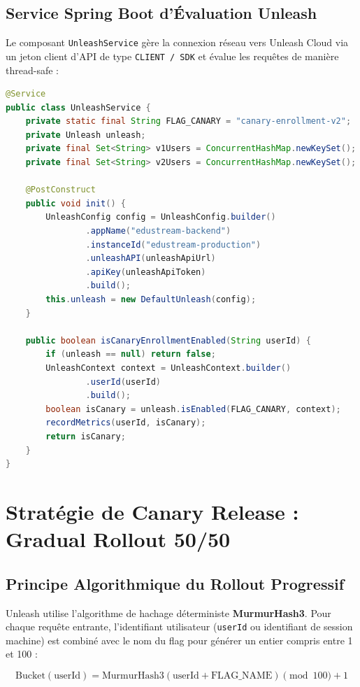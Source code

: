 \documentclass[12pt, a4paper]{article}
\begin{document}
\subsection{Service Spring Boot d'Évaluation Unleash}
Le composant \texttt{UnleashService} gère la connexion réseau vers Unleash Cloud via un jeton client d'API de type \texttt{CLIENT / SDK} et évalue les requêtes de manière thread-safe :

\begin{lstlisting}[language=Java, caption=Composant UnleashService avec gestion du contexte utilisateur]
@Service
public class UnleashService {
    private static final String FLAG_CANARY = "canary-enrollment-v2";
    private Unleash unleash;
    private final Set<String> v1Users = ConcurrentHashMap.newKeySet();
    private final Set<String> v2Users = ConcurrentHashMap.newKeySet();

    @PostConstruct
    public void init() {
        UnleashConfig config = UnleashConfig.builder()
                .appName("edustream-backend")
                .instanceId("edustream-production")
                .unleashAPI(unleashApiUrl)
                .apiKey(unleashApiToken)
                .build();
        this.unleash = new DefaultUnleash(config);
    }

    public boolean isCanaryEnrollmentEnabled(String userId) {
        if (unleash == null) return false;
        UnleashContext context = UnleashContext.builder()
                .userId(userId)
                .build();
        boolean isCanary = unleash.isEnabled(FLAG_CANARY, context);
        recordMetrics(userId, isCanary);
        return isCanary;
    }
}
\end{lstlisting}

\section{Stratégie de Canary Release : Gradual Rollout 50/50}
\subsection{Principe Algorithmique du Rollout Progressif}
Unleash utilise l'algorithme de hachage déterministe \textbf{MurmurHash3}. Pour chaque requête entrante, l'identifiant utilisateur (\texttt{userId} ou identifiant de session machine) est combiné avec le nom du flag pour générer un entier compris entre 1 et 100 :

\begin{equation}
\text{Bucket}(\text{userId}) = \text{MurmurHash3}(\text{userId} + \text{FLAG\_NAME}) \pmod{100} + 1
\end{equation}
\end{document}
